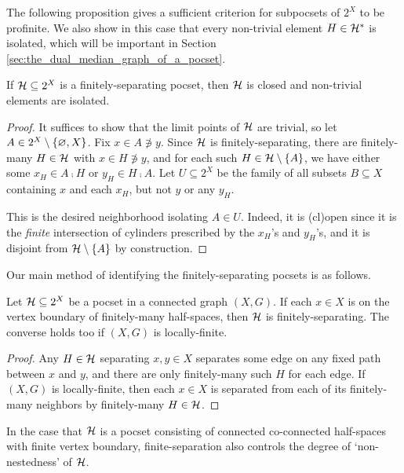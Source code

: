 \documentclass[reqno]{amsart}
\begin{document}
    The following proposition gives a sufficient criterion for subpocsets of $2^X$ to be profinite. We also show in this case that every non-trivial element $H\in\mathcal{H}^\ast$ is isolated, which will be important in Section \ref{sec:the_dual_median_graph_of_a_pocset}.

    \begin{lemma}\label{lem:finitely-separating_non-trivial_isolated}
        If $\mathcal{H}\subseteq2^X$ is a finitely-separating pocset, then $\mathcal{H}$ is closed and non-trivial elements are isolated.
    \end{lemma}
    \begin{proof}
        It suffices to show that the limit points of $\mathcal{H}$ are trivial, so let $A\in2^X\setminus\left\{\varnothing,X\right\}$. Fix $x\in A\not\ni y$. Since $\mathcal{H}$ is finitely-separating, there are finitely-many $H\in\mathcal{H}$ with $x\in H\not\ni y$, and for each such $H\in\mathcal{H}\setminus\left\{A\right\}$, we have either some $x_H\in A\comp H$ or $y_H\in H\comp A$. Let $U\subseteq2^X$ be the family of all subsets $B\subseteq X$ containing $x$ and each $x_H$, but not $y$ or any $y_H$.

        This is the desired neighborhood isolating $A\in U$. Indeed, it is (cl)open since it is the \textit{finite} intersection of cylinders prescribed by the $x_H$'s and $y_H$'s, and it is disjoint from $\mathcal{H}\setminus\left\{A\right\}$ by construction.
    \end{proof}

    Our main method of identifying the finitely-separating pocsets is as follows.

    \begin{lemma}\label{lem:finitely_separating_iff_on_boundary_of_finite}
        Let $\mathcal{H}\subseteq2^X$ be a pocset in a connected graph $(X,G)$. If each $x\in X$ is on the vertex boundary of finitely-many half-spaces, then $\mathcal{H}$ is finitely-separating. The converse holds too if $(X,G)$ is locally-finite.
    \end{lemma}
    \begin{proof}
        Any $H\in\mathcal{H}$ separating $x,y\in X$ separates some edge on any fixed path between $x$ and $y$, and there are only finitely-many such $H$ for each edge. If $(X,G)$ is locally-finite, then each $x\in X$ is separated from each of its finitely-many neighbors by finitely-many $H\in\mathcal{H}$.
    \end{proof}

    In the case that $\mathcal{H}$ is a pocset consisting of connected co-connected half-spaces with finite vertex boundary, finite-separation also controls the degree of `non-nestedness' of $\mathcal{H}$.
\end{document}
